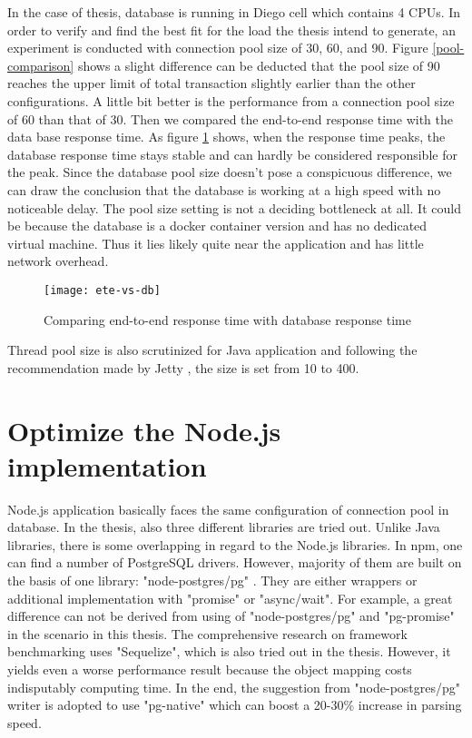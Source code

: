 In the case of thesis, database is running in Diego cell which contains 4 CPUs. In order to verify and find the best fit for the load the thesis intend to generate, an experiment is conducted with connection pool size of 30, 60, and 90.  Figure \ref{pool-comparison} shows a slight difference can be deducted that the pool size of 90 reaches the upper limit of total transaction slightly earlier than the other configurations. A little bit better is the performance from a connection pool size of 60 than that of 30. Then we compared the end-to-end response time with the data base response time.  As figure \ref{ete-vs-db} shows, when the response time peaks, the database response time stays stable and can hardly be considered responsible for the peak. Since the database pool size doesn't pose a conspicuous difference, we can draw the conclusion that the database is working at a high speed with no noticeable delay. The pool size setting is not a deciding bottleneck at all. It could be because the database is a docker container version and has no dedicated virtual machine. Thus it lies likely quite near the application and has little network overhead. 

\begin{figure}[h]
	\centering
	\texttt{[image: ete-vs-db]}
	\caption{Comparing end-to-end response time with database response time}
	\label{ete-vs-db}
\end{figure}

Thread pool size is also scrutinized for Java application and following the recommendation made by Jetty \citep{threadpool}, the size is set from 10 to 400. \\


\section{Optimize the Node.js implementation}
Node.js application basically faces the same configuration of connection pool in database. In the thesis, also three different libraries are tried out. Unlike Java libraries, there is some overlapping in regard to the Node.js libraries. In npm, one can find a number of PostgreSQL drivers. However, majority of them are built on the basis of one library: "node-postgres/pg" \citep{node-pg}. They are either wrappers or additional implementation with "promise" or "async/wait". For example, a great difference can not be derived from using of "node-postgres/pg" and "pg-promise" in the scenario in this thesis. The comprehensive research on framework benchmarking \citep{Benchmark} uses "Sequelize", which is also tried out in the thesis. However, it yields even a worse performance result because the object mapping costs indisputably computing time. In the end, the suggestion from "node-postgres/pg" writer is adopted to use "pg-native" which can boost a 20-30\% increase in parsing speed.\\




